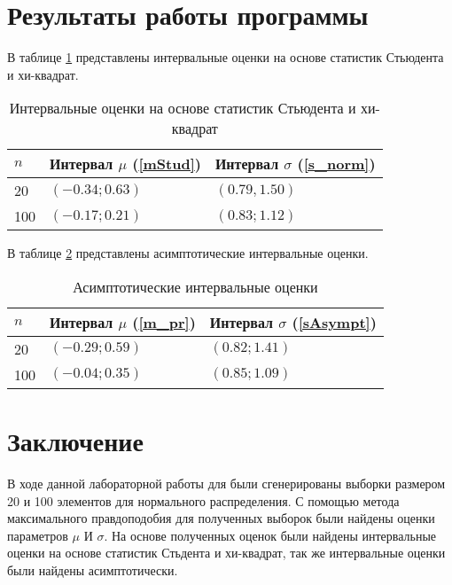 \documentclass[12pt]{article}
\begin{document}
\section{Результаты работы программы}
В таблице \ref{table:chi} представлены интервальные оценки на основе статистик Стьюдента и хи-квадрат.

\begin{table}[H]
	\begin{center}
		\begin{tabular}{|l|l|l|}
		\hline
		$n$ & Интервал $\mu$  (\ref{mStud})  & Интервал $\sigma$ (\ref{s_norm})\\ \hline
		20  & $(-0.34; 0.63)$ & $(0.79, 1.50)$  \\ \hline
		100 & $(-0.17; 0.21)$ & $(0.83; 1.12)$  \\ \hline
	\end{tabular}
	\end{center}
\caption{Интервальные оценки на основе статистик Стьюдента и хи-квадрат}

\label{table:chi}
\end{table}
	
	 В таблице \ref{table:asumpt} представлены асимптотические интервальные оценки.
	
	
	\begin{table}[H]
		\begin{center}
			\begin{tabular}{|l|l|l|}
			\hline
			$n$ & Интервал $\mu$ (\ref{m_pr})   & Интервал $\sigma$ (\ref{sAsympt})\\ \hline
			20  & $(-0.29; 0.59)$ & $(0.82; 1.41)$  \\ \hline
			100 & $(-0.04; 0.35)$ & $(0.85; 1.09)$  \\ \hline
		\end{tabular}
		\end{center}
	
	\caption{Асимптотические интервальные оценки}
	\label{table:asumpt}
	\end{table}


\newpage
 \section*{Заключение}
{}
\par  В ходе данной лабораторной работы для были сгенерированы выборки размером 20 и 100 элементов для нормального распределения. С помощью метода максимального правдоподобия для полученных выборок  были найдены оценки параметров $\mu$ И  $\sigma$. На основе полученных оценок были найдены интервальные оценки на основе статистик Стьдента и хи-квадрат, так же интервальные оценки были найдены асимптотически.
	
\end{document}
